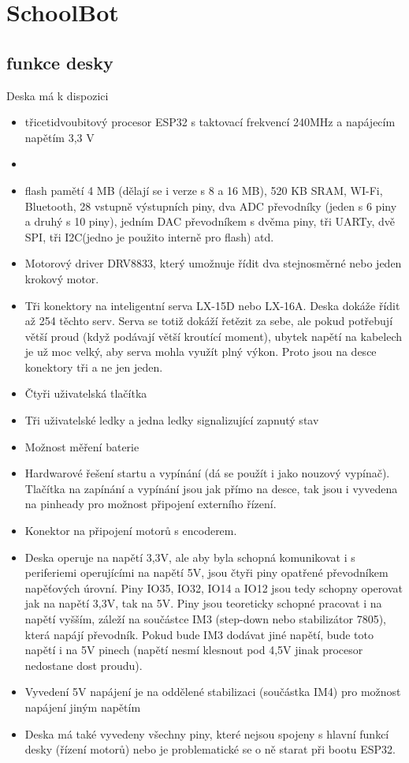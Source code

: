\documentclass{template/socthesis}
\begin{document}
\chapter{SchoolBot}

\section{funkce desky}

Deska má k dispozici

\begin{itemize}
	\item třicetidvoubitový procesor ESP32 s taktovací frekvencí 240MHz a napájecím napětím 3,3 V 
	\item \item flash pamětí 4 MB (dělají se i verze s 8 a 16 MB), 520 KB SRAM, WI-Fi, Bluetooth, 28 vstupně výstupních piny, dva ADC převodníky (jeden s 6 piny a druhý s 10 piny), jedním DAC převodníkem s dvěma piny, tři UARTy, dvě SPI, tři I2C(jedno je použito interně pro flash) atd.
	\item Motorový driver DRV8833, který umožnuje řídit dva stejnosměrné nebo jeden krokový motor.
	\item Tři konektory na inteligentní serva LX-15D nebo LX-16A. Deska dokáže řídit až 254 těchto serv. Serva se totiž dokáží řetězit za sebe, ale pokud potřebují větší proud (když podávají větší kroutící moment), ubytek napětí na kabelech je už moc velký, aby serva mohla využít plný výkon. Proto jsou na desce konektory tři a ne jen jeden.
	\item Čtyři uživatelská tlačítka
	\item Tři uživatelské ledky a jedna ledky signalizující zapnutý stav
	\item Možnost měření baterie
	\item Hardwarové řešení startu a vypínání (dá se použít i jako nouzový vypínač). Tlačítka na zapínání a vypínání jsou jak přímo na desce, tak jsou i vyvedena na pinheady pro možnost připojení externího řízení.
	\item Konektor na připojení motorů s encoderem.
	\item Deska operuje na napětí 3,3V, ale aby byla schopná komunikovat i s periferiemi operujícími
	na napětí 5V, jsou čtyři piny opatřené převodníkem napěťových úrovní.
	Piny IO35, IO32, IO14 a IO12 jsou tedy schopny operovat jak na napětí 3,3V, tak na 5V.
	Piny jsou teoreticky schopné pracovat i na napětí vyšším, záleží na součástce IM3
	(step-down nebo stabilizátor 7805), která napájí převodník. Pokud bude IM3 dodávat jiné napětí, bude toto napětí i na 5V pinech (napětí nesmí klesnout pod 4,5V jinak procesor nedostane dost proudu).
	\item Vyvedení 5V napájení je na oddělené stabilizaci (součástka IM4) pro možnost napájení jiným napětím
	\item Deska má také vyvedeny všechny piny, které nejsou spojeny 
	s hlavní funkcí desky (řízení motorů) nebo je problematické se o ně starat při bootu ESP32.
	\end{itemize}
\end{document}
